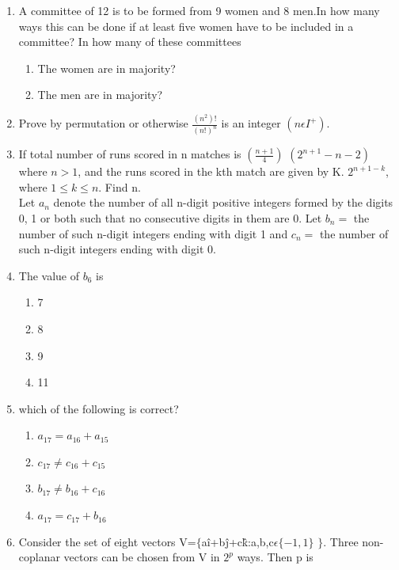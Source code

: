 \documentclass[journal,12pt,twocolumn]{IEEEtran}
\begin{document}
\begin{enumerate}
\item A committee of 12 is to be formed from 9 women and 8 men.In how many ways this can be done if at least five women have to be included in a committee? In how many of these committees
\begin{enumerate}
\item The women are in majority?
\item The men are in majority?\\
\end{enumerate}
\item Prove by permutation or otherwise $\frac{(n^2)!}{(n!)^n}$ is an integer $(n\epsilon I^+)$.\\
\item If total number of runs scored in n matches is $(\frac{n+1}{4})$ $(2^{n+1}-n-2)$ where $n>1$, and the runs scored in the kth match are given by K. $2^{n+1-k}$, where $1\leq k\leq n.$ Find n.\\

Let $a_n$ denote the number of all n-digit positive integers formed by the digits 0, 1 or both such that no consecutive digits in them are 0. Let $b_n=$ the number of such n-digit integers ending with digit 1 and $c_n=$ the number of such n-digit integers ending with digit 0.\\
\item The value of $b_6$ is
\begin{enumerate}
\item 7
\item 8
\item 9
\item 11\\
\end{enumerate}
\item which of the following is correct?
\begin{enumerate}
\item $a_{17} = a_{16} + a_{15}$
\item $c_{17} \neq c_{16} + c_{15}$
\item $b_{17} \neq b_{16} + c_{16}$
\item $a_{17} = c_{17} + b_{16}$\\
\end{enumerate}
\item Consider the set of eight vectors V=$\lbrace$a\^{i}+b\^{j}+c\^{k}:a,b,c$\epsilon\lbrace-1,1\rbrace$ $\rbrace.$ Three non-coplanar vectors can be chosen from V in $2^p$ ways. Then p is\\


\end{enumerate}
\end{document}
